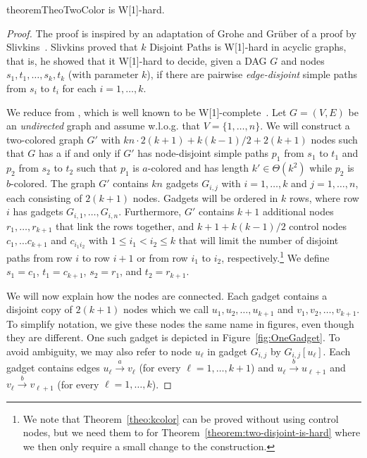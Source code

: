 \documentclass[a4paper,english]{lipics-v2016}
\theoremstyle{plain}
\begin{document}
\begin{restatable}{theorem}{TheoTwoColor}\label{theo:kcolor}
  \knodecolordisjointpaths is W[1]-hard. 
\end{restatable}
\begin{proof}
  The proof is inspired by an adaptation of Grohe and Gr\"uber
  \cite[Lemma 16]{GroheICALP-07} of a proof by 
  Slivkins~\cite[Theorem 2.1]{slivkins}. Slivkins proved that
  $k$ \textsf{Disjoint Paths} is W[1]-hard in acyclic graphs, that is, he
  showed that it W[1]-hard to decide, given a DAG   $G$ and nodes $s_1, t_1, \ldots, s_k, t_k$ (with parameter $k$), if
  there are pairwise \emph{edge-disjoint} simple paths from $s_i$ to
  $t_i$ for each $i = 1,\ldots,k$. 
              
  We reduce from \kclique, which is well known to be
  W[1]-complete~\cite[Corollary 3.2]{DowneyTCS-95}.
                                  Let $G=(V,E)$ be an \emph{undirected} graph and assume \mbox{w.l.o.g.} that $V =
  \{1,\ldots,n\}$. We will construct a two-colored graph $G'$ with
  $kn\cdot 2(k+1) +k(k-1)/2+ 2(k+1)$   nodes such that $G$ has a \kclique if and only if $G'$ has
  node-disjoint simple paths $p_1$ from $s_1$ to $t_1$ and $p_2$ from
  $s_2$ to $t_2$ such that $p_1$ is $a$-colored and has length $k'
  \in \Theta(k^2)$ while $p_2$ is $b$-colored.  The graph $G'$
  contains $kn$ gadgets $G_{i,j}$ with $i=1,\ldots, k$ and $j =
  1,\ldots,n$, each consisting of $2(k+1)$ nodes. Gadgets will be
  ordered in $k$ rows, where row $i$ has gadgets $G_{i,1}, \ldots,
  G_{i,n}$.  Furthermore, $G'$ contains $k+1$ additional nodes
  $r_1,\ldots,r_{k+1}$ that link the rows together, and $k+1+k(k-1)/2$
  control nodes $c_1, \ldots c_{k+1}$ and $c_{i_1i_2}$ with $1 \leq i_1 <
  i_2 \leq k$ that will limit the number    of disjoint paths from row
  $i$ to row $i+1$ or from row $i_1$ to $i_2$,
  respectively.\footnote{We note that Theorem~\ref{theo:kcolor} can 
    be proved without using control nodes, but we need them to for
    Theorem~\ref{theorem:two-disjoint-is-hard} where we then only require a small change to the
    construction.}
  We define $s_1 = c_1$, $t_1 = c_{k+1}$, $s_2 = r_1$, and $t_2 = r_{k+1}$.



  We will now explain how the nodes are connected.  Each gadget
  contains a disjoint copy of $2(k+1)$ nodes which we call $u_1,u_2,\ldots,u_{k+1}$ and
  $v_1,v_2,\ldots,v_{k+1}$. To simplify notation, we give these nodes
  the same name in figures, even though they are different. One such gadget is depicted in Figure~\ref{fig:OneGadget}. To avoid
  ambiguity, we may also refer to node $u_\ell$ in gadget $G_{i,j}$ by
  $G_{i,j}[u_\ell]$. Each gadget contains edges $u_\ell
  \stackrel{a}{\to} v_\ell$ (for every $\ell = 1,\ldots,k+1$) and
  $u_\ell \stackrel{b}{\to} u_{\ell+1}$ and $v_\ell \stackrel{b}{\to}
  v_{\ell+1}$ (for every $\ell = 1,\ldots,k$).  
        

\end{proof}
\end{document}
